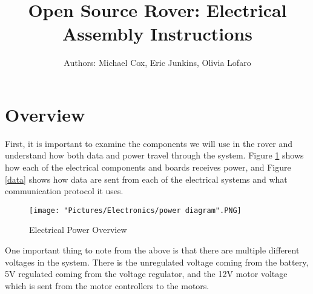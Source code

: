 \documentclass[12pt]{article}
\begin{document}
\title{Open Source Rover: Electrical Assembly Instructions}
\author{Authors: Michael Cox, Eric Junkins, Olivia Lofaro}

\makeatletter         
\def\@maketitle{
\begin{center}	
	\makebox[\textwidth][c]{ \texttt{[image: "Pictures/Electronics/electronics title".png]}}
	{\Huge \bfseries \sffamily \@title }\\[3ex] 
	{\Large \sffamily \@author}\\[3ex] 
	\texttt{[image: "Pictures/Electronics/JPL logo".png]}
\end{center}}
\makeatother

\maketitle



\newpage


\tableofcontents

\newpage

\section{Overview}

First, it is important to examine the components we will use in the rover and understand how both data and power travel through the system. Figure \ref{power} shows how each of the electrical components and boards receives power, and Figure \ref{data} shows how data are sent from each of the electrical systems and what communication protocol it uses. 
\begin{figure}[H]
  	\centering
    	\texttt{[image: "Pictures/Electronics/power diagram".PNG]}
  	\caption{Electrical Power Overview}
	\label{power}
\end{figure}

\noindent One important thing to note from the above is that there are multiple different voltages in the system. There is the unregulated voltage coming from the battery, 5V regulated coming from the voltage regulator, and the 12V motor voltage which is sent from the motor controllers to the motors. 
\end{document}
